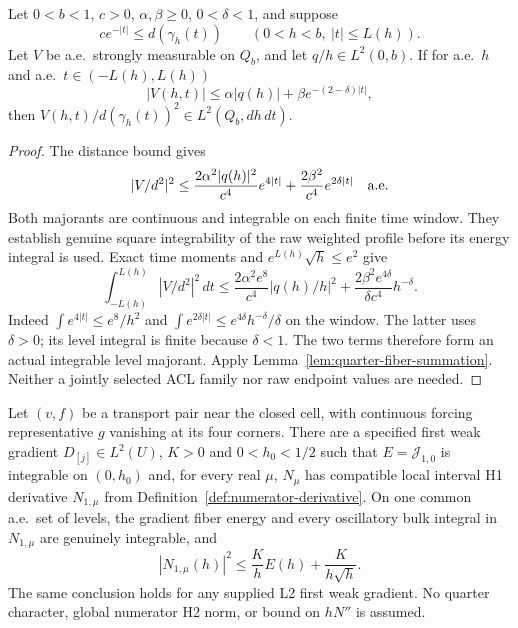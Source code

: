 \begin{lemma}
\label{lem:quarter-second-mass}
\leanok
Let $0<b<1$, $c>0$, $\alpha,\beta\ge0$, $0<\delta<1$, and suppose
\[
 c e^{-|t|}\le d(\gamma_h(t))
 \qquad(0<h<b,\ |t|\le L(h)).
\]
Let $V$ be a.e.\ strongly measurable on $Q_b$, and let
$q/h\in L^2(0,b)$. If for a.e.\ $h$ and a.e.\ $t\in(-L(h),L(h))$
\[
 |V(h,t)|\le\alpha|q(h)|+\beta e^{-(2-\delta)|t|},
\]
then $V(h,t)/d(\gamma_h(t))^2\in L^2(Q_b,dh\,dt)$.
\end{lemma}

\begin{proof}
\leanok
The distance bound gives
\[
 |V/d^2|^2
 \le \frac{2\alpha^2|q(h)|^2}{c^4}e^{4|t|}
       +\frac{2\beta^2}{c^4}e^{2\delta|t|}\quad\hbox{a.e.}
\]
Both majorants are continuous and integrable on each finite time window.
They establish genuine square integrability of the raw weighted profile
before its energy integral is used.
Exact time moments and $e^{L(h)}\sqrt h\le e^2$ give
\[
 \int_{-L(h)}^{L(h)}|V/d^2|^2\,dt
 \le \frac{2\alpha^2e^8}{c^4}|q(h)/h|^2
      +\frac{2\beta^2e^{4\delta}}{\delta c^4}h^{-\delta}.
\]
Indeed $\int e^{4|t|}\le e^8/h^2$ and
$\int e^{2\delta|t|}\le e^{4\delta}h^{-\delta}/\delta$ on the window.
The latter uses $\delta>0$; its level integral is finite because
$\delta<1$. The two terms therefore form an actual integrable level
majorant. Apply Lemma~\ref{lem:quarter-fiber-summation}.
Neither a jointly selected ACL family nor raw endpoint values are needed.
\end{proof}

\begin{lemma}
\label{lem:zero-saddle-numerator-derivative}
\leanok
Let $(v,f)$ be a transport pair near the closed cell, with continuous
forcing representative $g$ vanishing at its four corners.
There are a specified first weak gradient $D_{[j]}\in L^2(U)$,
$K>0$ and $0<h_0<1/2$ such that $E=\mathcal J_{1,0}$ is integrable
on $(0,h_0)$ and, for every real $\mu$, $N_\mu$ has compatible local
interval H1 derivative $N_{1,\mu}$ from
Definition~\ref{def:numerator-derivative}.
On one common a.e.\ set of levels, the gradient fiber energy and every
oscillatory bulk integral in $N_{1,\mu}$ are genuinely integrable, and
\[
 |N_{1,\mu}(h)|^2\le \frac K h E(h)+\frac K{h\sqrt h}.
\]
The same conclusion holds for any supplied L2 first weak gradient.
No quarter character, global numerator H2 norm, or bound on $hN''$
is assumed.
\end{lemma}

